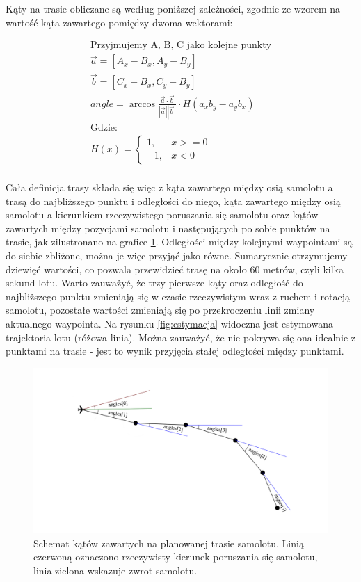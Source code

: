 \documentclass[12pt, a4paper]{article}
\begin{document}
Kąty na trasie obliczane są według poniższej zależności, zgodnie ze wzorem na wartość kąta zawartego pomiędzy dwoma wektorami:

\begin{gather*} 
	\text{Przyjmujemy A, B, C jako kolejne punkty} \\ 
 	\vec{a} = [A_x - B_x, A_y - B_y] \\
 	\vec{b} = [C_x - B_x, C_y - B_y] \\
 	angle = 	\arccos{\frac{\vec{a} \cdot \vec{b}}{|\vec{a}||\vec{b}|} } \cdot H(a_x b_y -  a_y b_x) \\ 
 	\text{Gdzie:} \\
 	H(x) = \begin{cases} 1, & x >= 0 \\ -1, & x < 0 \end{cases} \\
\end{gather*}

Cała definicja trasy składa się więc z kąta zawartego między osią samolotu a trasą do najbliższego punktu i odległości do niego, kąta zawartego między osią samolotu a kierunkiem rzeczywistego poruszania się samolotu oraz kątów zawartych między pozycjami samolotu i następujących po sobie punktów na trasie, jak zilustronano na grafice \ref{fig:katy}. Odległości między kolejnymi waypointami są do siebie zbliżone, można je więc przyjąć jako równe. Sumarycznie otrzymujemy dziewięć wartości, co pozwala przewidzieć trasę na około 60 metrów, czyli kilka sekund lotu. Warto zauważyć, że trzy pierwsze kąty oraz odległość do najbliższego punktu zmieniają się w czasie rzeczywistym wraz z ruchem i rotacją samolotu, pozostałe wartości zmieniają się po przekroczeniu linii zmiany aktualnego waypointa. Na rysunku \ref{fig:estymacja} widoczna jest estymowana trajektoria lotu (różowa linia). Można zauważyć, że nie pokrywa się ona idealnie z punktami na trasie - jest to wynik przyjęcia stałej odległości między punktami.

 \begin{figure}[ht]
    \centering
    \includegraphics[width=1\textwidth]{angles}
    \caption{Schemat kątów zawartych na planowanej trasie samolotu. Linią czerwoną oznaczono rzeczywisty kierunek poruszania się samolotu, linia zielona wskazuje zwrot samolotu.}
    \label{fig:katy}
\end{figure}
\end{document}
